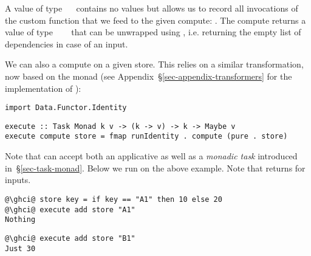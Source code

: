 \noindent
A value of type ~\hs{[}\hs{k]}~ contains no values  but
allows us to record all invocations of the custom  function that we
feed to the given compute: . The compute returns a
value of type ~~\hs{[}\hs{k]}~ that can be
unwrapped using , i.e. returning the empty list of
dependencies in case of an input.

We can also  a compute on a given store. This relies on a similar
transformation, now based on the  monad (see
Appendix~\S\ref{sec-appendix-transformers} for the implementation of
):

\vspace{1mm}
\begin{verbatim}
import Data.Functor.Identity
\end{verbatim}
\vspace{0.5mm}
\begin{verbatim}
execute :: Task Monad k v -> (k -> v) -> k -> Maybe v
execute compute store = fmap runIdentity . compute (pure . store)
\end{verbatim}
\vspace{1mm}

\noindent
Note that  can accept both an applicative as well as a \emph{monadic
task} introduced in~\S\ref{sec-task-monad}. Below we run  on
the above  example. Note that  returns  for
inputs.

\vspace{1mm}
\begin{verbatim}
@\ghci@ store key = if key == "A1" then 10 else 20
@\ghci@ execute add store "A1"
Nothing
\end{verbatim}
\begin{verbatim}
@\ghci@ execute add store "B1"
Just 30
\end{verbatim}








